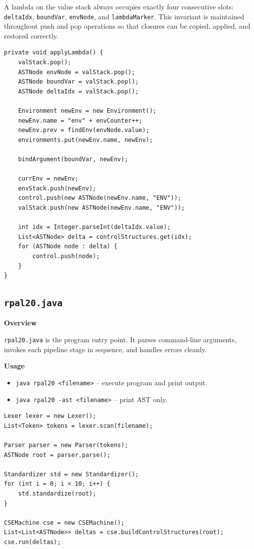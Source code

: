 \documentclass[12pt,a4paper]{article}
\begin{document}
A lambda on the value stack always occupies exactly four consecutive slots: \texttt{deltaIdx}, \texttt{boundVar}, \texttt{envNode}, and \texttt{lambdaMarker}. This invariant is maintained throughout push and pop operations so that closures can be copied, applied, and restored correctly.

\begin{lstlisting}[style=javacode, caption={CSEMachine.applyLambda() -- CSE Rule 4}]
private void applyLambda() {
    valStack.pop();
    ASTNode envNode = valStack.pop();
    ASTNode boundVar = valStack.pop();
    ASTNode deltaIdx = valStack.pop();

    Environment newEnv = new Environment();
    newEnv.name = "env" + envCounter++;
    newEnv.prev = findEnv(envNode.value);
    environments.put(newEnv.name, newEnv);

    bindArgument(boundVar, newEnv);

    currEnv = newEnv;
    envStack.push(newEnv);
    control.push(new ASTNode(newEnv.name, "ENV"));
    valStack.push(new ASTNode(newEnv.name, "ENV"));

    int idx = Integer.parseInt(deltaIdx.value);
    List<ASTNode> delta = controlStructures.get(idx);
    for (ASTNode node : delta) {
        control.push(node);
    }
}
\end{lstlisting}

\subsection{\texttt{rpal20.java}}

\textbf{Overview}

\texttt{rpal20.java} is the program entry point. It parses command-line arguments, invokes each pipeline stage in sequence, and handles errors cleanly.

\textbf{Usage}

\begin{itemize}
    \item \texttt{java rpal20 <filename>} -- execute program and print output.
    \item \texttt{java rpal20 -ast <filename>} -- print AST only.
\end{itemize}

\begin{lstlisting}[style=javacode, caption={rpal20 pipeline}]
Lexer lexer = new Lexer();
List<Token> tokens = lexer.scan(filename);

Parser parser = new Parser(tokens);
ASTNode root = parser.parse();

Standardizer std = new Standardizer();
for (int i = 0; i < 10; i++) {
    std.standardize(root);
}

CSEMachine cse = new CSEMachine();
List<List<ASTNode>> deltas = cse.buildControlStructures(root);
cse.run(deltas);
\end{lstlisting}
\end{document}
